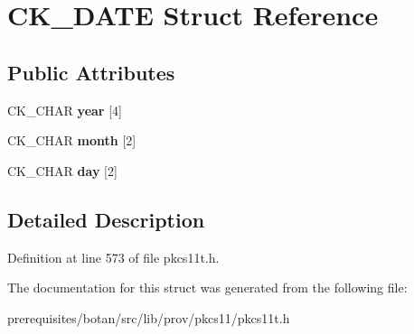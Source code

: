 \hypertarget{struct_c_k___d_a_t_e}{}\section{C\+K\+\_\+\+D\+A\+TE Struct Reference}
\label{struct_c_k___d_a_t_e}
\subsection*{Public Attributes}
\begin{DoxyCompactItemize}
\item 
\mbox{\label{struct_c_k___d_a_t_e_a223a9ead1aa935845bea0e9426317131}} 
C\+K\+\_\+\+C\+H\+AR {\bfseries year} \mbox{[}4\mbox{]}
\item 
\mbox{\label{struct_c_k___d_a_t_e_adbc049ebf70a76bb11c7b44dc6c82654}} 
C\+K\+\_\+\+C\+H\+AR {\bfseries month} \mbox{[}2\mbox{]}
\item 
\mbox{\label{struct_c_k___d_a_t_e_ae753815abaa535dbca99dfe3a079cb8a}} 
C\+K\+\_\+\+C\+H\+AR {\bfseries day} \mbox{[}2\mbox{]}
\end{DoxyCompactItemize}


\subsection{Detailed Description}


Definition at line 573 of file pkcs11t.\+h.



The documentation for this struct was generated from the following file\+:\begin{DoxyCompactItemize}
\item 
prerequisites/botan/src/lib/prov/pkcs11/pkcs11t.\+h\end{DoxyCompactItemize}

